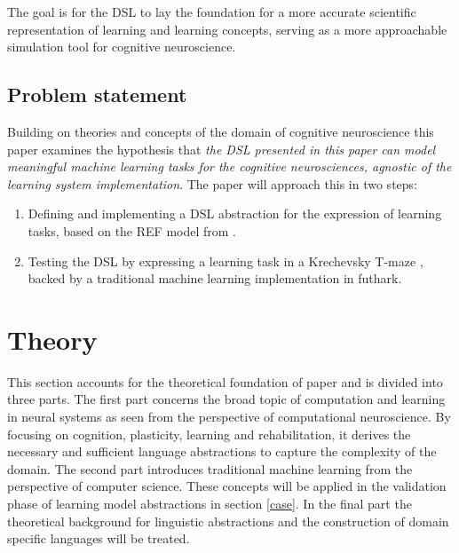 \documentclass[a4paper,oneside]{memoir}
\begin{document}
The goal is for the DSL to lay the foundation for a more accurate scientific
representation of learning and learning concepts, serving as a more approachable
simulation tool for cognitive neuroscience.


\subsection{Problem statement}
Building on theories and concepts of the domain of cognitive neuroscience
this paper examines the hypothesis that
\textit{
  the DSL presented in this paper can model meaningful machine learning
  tasks for the cognitive neurosciences,
  agnostic of the learning system implementation}.
The paper will approach this in two steps:

\begin{enumerate}
  \item Defining and implementing a DSL abstraction for the expression of
        learning tasks, based on the REF model from \autocite{Mogensen2011}.
  \item Testing the DSL by expressing a learning task in a Krechevsky
        T-maze \autocite{Krechevsky1932}, backed by a traditional machine
        learning implementation in \gls{futhark}.
\end{enumerate}

\section{Theory}
This section accounts for the theoretical foundation of paper and is divided
into three parts.
The first part concerns the broad topic of computation and learning in neural
systems as seen from the perspective of computational neuroscience. By focusing
on cognition, plasticity, learning and rehabilitation, it derives
the necessary and sufficient language abstractions to capture the complexity
of the domain.
The second part introduces traditional machine learning from the perspective of
computer science. These concepts will be applied in the validation phase of
learning model abstractions in section \ref{case}.
In the final part the theoretical background for linguistic abstractions and
the construction of domain specific languages will be treated.
\end{document}
